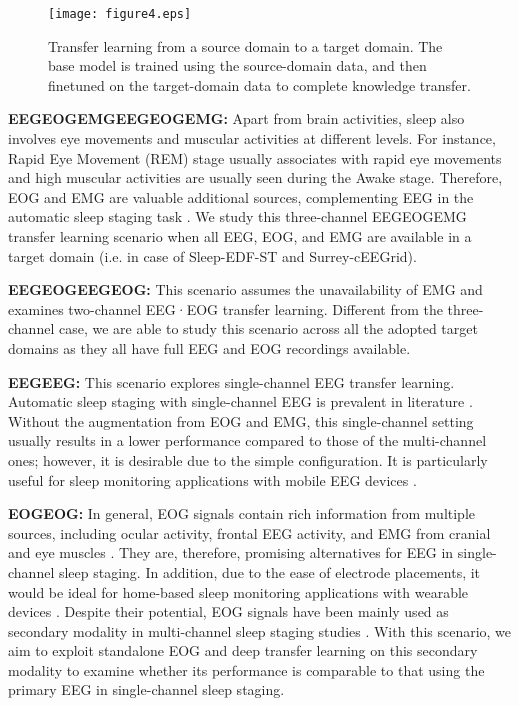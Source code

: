 \documentclass[journal,twoside,web]{ieeecolor}
\begin{document}
\begin{figure} [!t]
	\centering
	\texttt{[image: figure4.eps]}
	\vspace{-0.15cm}
	\caption{Transfer learning from a source domain to a target domain. The base model is trained using the source-domain data, and then finetuned on the target-domain data to complete knowledge transfer.}
	\label{fig:sleep_transfer}
	\vspace{-0.25cm}
\end{figure}

{\bf EEGEOGEMGEEGEOGEMG:} Apart from brain activities, sleep also involves eye movements and muscular activities at different levels. For instance, Rapid Eye Movement (REM) stage usually associates with rapid eye movements and high muscular activities are usually seen during the Awake stage. Therefore, EOG and EMG are valuable additional sources, complementing EEG in the automatic sleep staging task \cite{Stephansen2018,Mikkelsen2018, Chambon2018, Andreotti2018, Phan2019b}. We study this three-channel EEGEOGEMG transfer learning scenario when all EEG, EOG, and EMG are available in a target domain (i.e. in case of Sleep-EDF-ST and Surrey-cEEGrid).

{\bf EEGEOGEEGEOG:} This scenario assumes the unavailability of EMG and examines two-channel EEG·EOG transfer learning. Different from the three-channel case, we are able to study this scenario across all the adopted target domains as they all have full EEG and EOG recordings available.

{\bf EEGEEG:} This scenario explores single-channel EEG transfer learning. Automatic sleep staging with single-channel EEG is prevalent in literature \cite{Koley2012, Tsinalis2016b, phan2018c, phan2018d, Kuo2011, Phan2013}. Without the augmentation from EOG and EMG, this single-channel setting usually results in a lower performance compared to those of the multi-channel ones; however, it is desirable due to the simple configuration. It is particularly useful for sleep monitoring applications with mobile EEG devices \cite{Mikkelsen2019, Sterr2018}.

{\bf EOGEOG:} In general, EOG signals contain rich information from multiple sources, including ocular activity, frontal EEG activity, and EMG from cranial and eye muscles \cite{Olesen2016}. They are, therefore, promising alternatives for EEG in single-channel sleep staging. In addition, due to the ease of electrode placements, it would be ideal for home-based sleep monitoring applications with wearable devices \cite{Mikkelsen2019, Sterr2018}. Despite their potential, EOG signals have been mainly used as secondary modality in multi-channel sleep staging studies \cite{Olesen2016, Liang2015}. With this scenario, we aim to exploit standalone EOG and deep transfer learning on this secondary modality to examine whether its performance is comparable to that using the primary EEG in single-channel sleep staging. 
\end{document}
